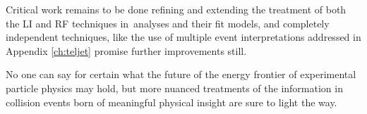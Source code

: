 Critical work remains to be done refining and extending the treatment of both the LI and RF techniques in \vhbb\,analyses and their fit models, and completely independent techniques, like the use of multiple event interpretations addressed in Appendix \ref{ch:teljet} promise further improvements still.  

No one can say for certain what the future of the energy frontier of experimental particle physics may hold, but more nuanced treatments of the information in collision events born of meaningful physical insight are sure to light the way.

